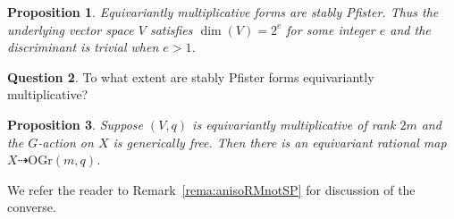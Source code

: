 \documentclass[12pt]{amsart}
\numberwithin{equation}{section}
\newcommand{\OGr}{\mathrm{OGr}}
\theoremstyle{plain}
\newtheorem{prop}{Proposition}[section]
\theoremstyle{definition}
\newtheorem{ques}[prop]{Question}
\theoremstyle{remark}
\begin{document}
\begin{prop} \label{prop:EMtoSP}
Equivariantly multiplicative forms are stably Pfister.
Thus the underlying vector space $V$ satisfies 
$\dim(V)=2^e$ for some integer $e$ and the
discriminant is trivial when $e>1$.  
\end{prop}
\begin{ques}
To what extent are stably Pfister forms equivariantly
multiplicative?
\end{ques}


\begin{prop} \label{prop:EMtoRatMap}
Suppose $(V,q)$ is equivariantly multiplicative of rank $2m$
and the $G$-action on $X$ is generically free.  
Then there is an equivariant rational map $X \dashrightarrow \OGr(m,q)$.
\end{prop} 
We refer the reader to Remark~\ref{rema:anisoRMnotSP}
for discussion of the converse.
\end{document}
